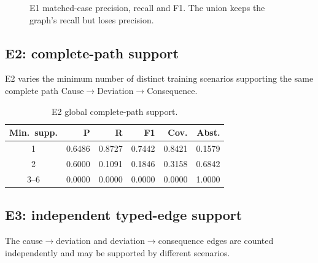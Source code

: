 \documentclass[10pt,twocolumn,a4paper]{extarticle}
\begin{document}
\begin{figure}[t]
\centering
{}
\caption{E1 matched-case precision, recall and F1. The union keeps the graph's recall but loses precision.}
\label{fig:e1}
\end{figure}

\subsection{E2: complete-path support}
E2 varies the minimum number of distinct training scenarios supporting the same complete path Cause$\to$Deviation$\to$Consequence.

\begin{table}[t]
\centering
\caption{E2 global complete-path support.}
\label{tab:e2}
\begin{tabular}{@{}c rrr rr@{}}
\toprule
\textbf{Min.\ supp.} & \textbf{P} & \textbf{R} & \textbf{F1} & \textbf{Cov.} & \textbf{Abst.}\\
\midrule
1 & 0.6486 & 0.8727 & 0.7442 & 0.8421 & 0.1579\\
2 & 0.6000 & 0.1091 & 0.1846 & 0.3158 & 0.6842\\
3--6 & 0.0000 & 0.0000 & 0.0000 & 0.0000 & 1.0000\\
\bottomrule
\end{tabular}
\end{table}

\subsection{E3: independent typed-edge support}
The cause$\to$deviation and deviation$\to$consequence edges are counted independently and may be supported by different scenarios.
\end{document}
